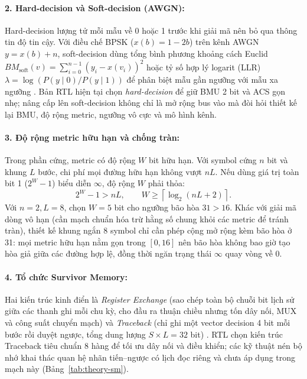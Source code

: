 \documentclass[12pt,a4paper]{article}
\renewcommand{\_}{\originalunderscore\allowbreak}
\begin{document}
\paragraph{2. Hard-decision và Soft-decision (AWGN):} Hard-decision lượng tử mỗi mẫu về 0 hoặc 1 trước khi giải mã nên bỏ qua thông tin độ tin cậy. Với điều chế BPSK ($x(b)=1-2b$) trên kênh AWGN $y=x(b)+n$, soft-decision dùng tổng bình phương khoảng cách Euclid $BM_{\mathrm{soft}}(v)=\sum_{i=0}^{n-1}(y_i-x(v_i))^2$ hoặc tỷ số hợp lý logarit (LLR) $\lambda=\log(P(y\mid 0)/P(y\mid 1))$ để phân biệt mẫu gần ngưỡng với mẫu xa ngưỡng \cite[Mục 9.3]{mit-lecture}. Bản RTL hiện tại chọn \emph{hard-decision} để giữ BMU 2 bit và ACS gọn nhẹ; nâng cấp lên soft-decision không chỉ là mở rộng bus vào mà đòi hỏi thiết kế lại BMU, độ rộng metric, ngưỡng vô cực và mô hình kênh.

\paragraph{3. Độ rộng metric hữu hạn và chống tràn:} Trong phần cứng, metric có độ rộng $W$ bit hữu hạn. Với symbol cứng $n$ bit và khung $L$ bước, chi phí mọi đường hữu hạn không vượt $nL$. Nếu dùng giá trị toàn bit 1 ($2^W-1$) biểu diễn $\infty$, độ rộng $W$ phải thỏa:
\begin{equation}
2^W-1>nL,\qquad W\ge\left\lceil\log_2(nL+2)\right\rceil.
\end{equation}
Với $n=2, L=8$, chọn $W=5$ bit cho ngưỡng bão hòa $31 > 16$. Khác với giải mã dòng vô hạn (cần mạch chuẩn hóa trừ hằng số chung khỏi các metric để tránh tràn), thiết kế khung ngắn 8 symbol chỉ cần phép cộng mở rộng kèm bão hòa ở 31: mọi metric hữu hạn nằm gọn trong $[0,16]$ nên bão hòa không bao giờ tạo hòa giả giữa các đường hợp lệ, đồng thời ngăn trạng thái $\infty$ quay vòng về 0.

\paragraph{4. Tổ chức Survivor Memory:} Hai kiến trúc kinh điển là \emph{Register Exchange} (sao chép toàn bộ chuỗi bit lịch sử giữa các thanh ghi mỗi chu kỳ, cho đầu ra thuận chiều nhưng tốn dây nối, MUX và công suất chuyển mạch) và \emph{Traceback} (chỉ ghi một vector decision 4 bit mỗi bước rồi duyệt ngược, tổng dung lượng $S\times L = 32$ bit) \cite[Chương 3--4]{oshea-thesis}. RTL chọn kiến trúc Traceback tiêu chuẩn 8 hàng để tối ưu dây nối và điều khiển; các kỹ thuật nén bộ nhớ khai thác quan hệ nhãn tiến--ngược \cite{odroma-storage} có lịch đọc riêng và chưa áp dụng trong mạch này (Bảng~\ref{tab:theory-sm}).
\end{document}
